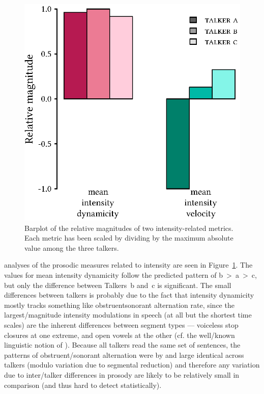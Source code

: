 \begin{figure}[bt]
	\begin{centering}
	\includegraphics{figures/posthocs/ProsodicMeasuresIntensityOnly.eps}
	\caption[Barplot of intensity metrics]{Barplot of the relative magnitudes of two intensity-related metrics.  Each metric has been scaled by dividing by the maximum absolute value among the three talkers.\label{fig:ProsodicMeasuresIntensity}}
	\end{centering}
\end{figure}

\Ph{} analyses of the prosodic measures related to intensity are seen in Figure~\ref{fig:ProsodicMeasuresIntensity}.  The values for mean intensity dynamicity follow the predicted pattern of \ac{b}~>~\ac{a}~>~\ac{c}, but only the difference between Talkers~\ac{b} and~\ac{c} is significant.  The small differences between talkers is probably due to the fact that intensity dynamicity mostly tracks something like obstruent\slsh sonorant alternation rate, since the largest\-/magnitude intensity modulations in speech (at all but the shortest time scales) are the inherent differences between segment types — voiceless stop closures at one extreme, and open vowels at the other (cf. the well\-/known linguistic notion of ).  Because all talkers read the same set of sentences, the patterns of obstruent\-/sonorant alternation were by and large identical across talkers (modulo variation due to segmental reduction) and therefore any variation due to inter\-/talker differences in prosody are likely to be relatively small in comparison (and thus hard to detect statistically).

